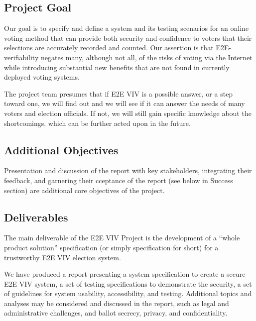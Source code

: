 \subsection{Project Goal}

Our goal is to specify and define a system and its testing scenarios
for an online voting method that can provide both security and
confidence to voters that their selections are accurately recorded and
counted. Our assertion is that E2E-verifiability negates many,
although not all, of the risks of voting via the Internet while
introducing substantial new benefits that are not found in currently
deployed voting systems.

The project team presumes that if E2E VIV is a possible answer, or a
step toward one, we will find out and we will see if it can answer the
needs of many voters and election officials. If not, we will still
gain specific knowledge about the shortcomings, which can be further
acted upon in the future. 

\subsection{Additional Objectives}

Presentation and discussion of the report with key stakeholders,
integrating their feedback, and garnering their cceptance of the
report (see below in Success section) are additional core objectives
of the project. 

\subsection{Deliverables}

The main deliverable of the E2E VIV Project is the development of a
``whole product solution'' specification (or simply specification for
short) for a trustworthy E2E VIV election system.

We have produced a report presenting a system specification to create
a secure E2E VIV system, a set of testing specifications to
demonstrate the security, a set of guidelines for system usability,
accessibility, and testing. Additional topics and analyses may be
considered and discussed in the report, such as legal and
administrative challenges, and ballot secrecy, privacy, and
confidentiality.

